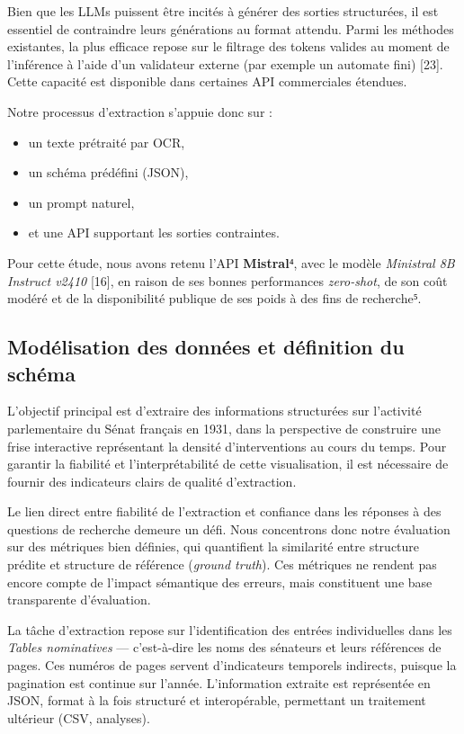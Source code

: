 Bien que les LLMs puissent être incités à générer des sorties structurées, il est essentiel de contraindre leurs générations au format attendu. Parmi les méthodes existantes, la plus efficace repose sur le filtrage des tokens valides au moment de l’inférence à l’aide d’un validateur externe (par exemple un automate fini) [23]. Cette capacité est disponible dans certaines API commerciales étendues.

Notre processus d’extraction s’appuie donc sur :

\begin{itemize}
\item un texte prétraité par OCR,
\item un schéma prédéfini (JSON),
\item un prompt naturel,
\item et une API supportant les sorties contraintes.

\end{itemize}
Pour cette étude, nous avons retenu l’API \textbf{Mistral}⁴, avec le modèle \emph{Ministral 8B Instruct v2410} [16], en raison de ses bonnes performances \emph{zero-shot}, de son coût modéré et de la disponibilité publique de ses poids à des fins de recherche⁵.

\subsection{Modélisation des données et définition du schéma}

L’objectif principal est d’extraire des informations structurées sur l’activité parlementaire du Sénat français en 1931, dans la perspective de construire une frise interactive représentant la densité d’interventions au cours du temps. Pour garantir la fiabilité et l’interprétabilité de cette visualisation, il est nécessaire de fournir des indicateurs clairs de qualité d’extraction.

Le lien direct entre fiabilité de l’extraction et confiance dans les réponses à des questions de recherche demeure un défi. Nous concentrons donc notre évaluation sur des métriques bien définies, qui quantifient la similarité entre structure prédite et structure de référence (\emph{ground truth}). Ces métriques ne rendent pas encore compte de l’impact sémantique des erreurs, mais constituent une base transparente d’évaluation.

La tâche d’extraction repose sur l’identification des entrées individuelles dans les \emph{Tables nominatives} — c’est-à-dire les noms des sénateurs et leurs références de pages. Ces numéros de pages servent d’indicateurs temporels indirects, puisque la pagination est continue sur l’année. L’information extraite est représentée en JSON, format à la fois structuré et interopérable, permettant un traitement ultérieur (CSV, analyses).

